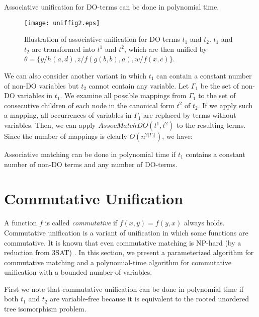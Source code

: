 \documentclass[a4paper]{llncs}
\begin{document}
\begin{theorem}
Associative unification for DO-terms can be done in polynomial time.
\label{thm:asspoly}
\end{theorem}

\begin{figure}[ht]
\begin{center}
\texttt{[image: uniffig2.eps]}
\caption{Illustration of associative unification for DO-terms $t_1$ and $t_2$.
$t_1$ and $t_2$ are transformed into $t^1$ and $t^2$,
which are then unified by
$\theta=\{y/h(a,d),z/f(g(b,b),a),w/f(x,c)\}$.}
\label{fig:asopoly}
\end{center}
\end{figure}

We can also consider another variant in which
$t_1$ can contain a constant number of non-DO variables
but $t_2$ cannot contain any variable.
Let $\Gamma_1$ be the set of non-DO variables in $t_1$.
We examine all possible mappings from $\Gamma_1$ to the set of
consecutive children of each node in the canonical form $t^2$ of $t_2$.
If we apply such a mapping, all occurrences of variables in $\Gamma_1$
are replaced by terms without variables.
Then, we can apply $AssocMatchDO(t^1,t^2)$ to the resulting terms.
Since the number of mappings is clearly $O(n^{2 |\Gamma_1|})$,
we have:

\begin{corollary}
Associative matching can be done in polynomial time 
if $t_1$ contains a constant number of non-DO terms and
any number of DO-terms.
\label{cor:asspoly}
\end{corollary}


\section{Commutative Unification}

A function $f$ is called \emph{commutative} if
$f(x,y)=f(y,x)$ always holds.
Commutative unification is a variant of unification
in which some functions are commutative.
It is known that 
even commutative matching
is NP-hard (by a reduction from 3SAT) \cite{benanav87}.
In this section,
we present a parameterized algorithm for commutative matching
and a polynomial-time algorithm for commutative unification
with a bounded number of variables.

First we note that commutative unification can be done in polynomial time
if both $t_1$ and $t_2$ are variable-free because it is equivalent to
the rooted unordered tree isomorphism problem.
\end{document}
